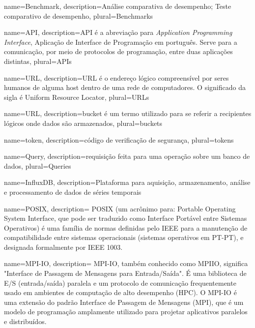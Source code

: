 
\makeglossaries




{
    name={Benchmark},
    description={Análise comparativa de desempenho; Teste comparativo de desempenho},
    plural={Benchmarks}
}

{
    name={API},
    description={API é a abreviação para \textit{Application Programming Interface}, Aplicação de Interface de Programação em português. Serve para a comunicação, por meio de protocolos de programação, entre duas aplicações distintas},
    plural={APIs}
}

{
    name={URL},
    description={URL é o endereço lógico compreensível por seres humanos de alguma host dentro de uma rede de computadores. O significado da sigla é Uniform Resource Locator},
    plural={URLs}
}

{
    name={URL},
    description={bucket é um termo utilizado para se referir a recipientes lógicos onde dados são armazenados},
    plural={buckets}
}

{
    name={token},
    description={código de verificação de segurança},
    plural={tokens}
}

{
    name={Query},
    description={requisição feita para uma operação sobre um banco de dados},
    plural={Queries}
}

{
    name={InfluxDB},
    description={Plataforma para aquisição, armazenamento, análise e processamento de dados de séries temporais}
}

{
    name={POSIX},
    description={ POSIX (um acrônimo para: Portable Operating System Interface, que pode ser traduzido como Interface Portável entre Sistemas Operativos) é uma família de normas definidas pelo IEEE para a manutenção de compatibilidade entre sistemas operacionais (sistemas operativos em PT-PT), e designada formalmente por IEEE 1003. }
}

{
    name={MPI-IO},
    description={ MPI-IO, também conhecido como MPIIO, significa "Interface de Passagem de Mensagens para Entrada/Saída". É uma biblioteca de E/S (entrada/saída) paralela e um protocolo de comunicação frequentemente usado em ambientes de computação de alto desempenho (HPC). O MPI-IO é uma extensão do padrão Interface de Passagem de Mensagens (MPI), que é um modelo de programação amplamente utilizado para projetar aplicativos paralelos e distribuídos. }
}

